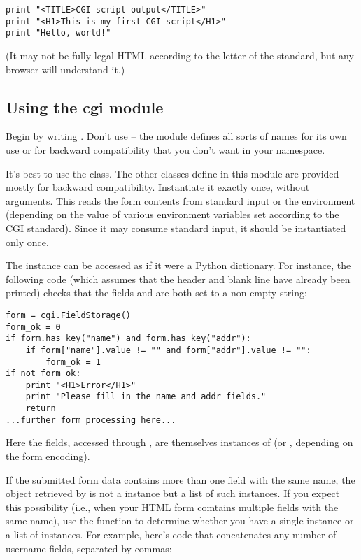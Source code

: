 \bcode\begin{verbatim}
print "<TITLE>CGI script output</TITLE>"
print "<H1>This is my first CGI script</H1>"
print "Hello, world!"
\end{verbatim}\ecode
%
(It may not be fully legal HTML according to the letter of the
standard, but any browser will understand it.)

\subsection{Using the cgi module}

Begin by writing .  Don't use  -- the
module defines all sorts of names for its own use or for backward 
compatibility that you don't want in your namespace.

It's best to use the  class.  The other classes define in this 
module are provided mostly for backward compatibility.  Instantiate it 
exactly once, without arguments.  This reads the form contents from 
standard input or the environment (depending on the value of various 
environment variables set according to the CGI standard).  Since it may 
consume standard input, it should be instantiated only once.

The  instance can be accessed as if it were a Python 
dictionary.  For instance, the following code (which assumes that the 
 header and blank line have already been printed) checks that 
the fields  and  are both set to a non-empty string:

\bcode\begin{verbatim}
form = cgi.FieldStorage()
form_ok = 0
if form.has_key("name") and form.has_key("addr"):
    if form["name"].value != "" and form["addr"].value != "":
        form_ok = 1
if not form_ok:
    print "<H1>Error</H1>"
    print "Please fill in the name and addr fields."
    return
...further form processing here...
\end{verbatim}\ecode
%
Here the fields, accessed through , are themselves instances
of  (or , depending on the form encoding).

If the submitted form data contains more than one field with the same
name, the object retrieved by  is not a 
instance but a list of such instances.  If you expect this possibility
(i.e., when your HTML form comtains multiple fields with the same
name), use the  function to determine whether you have a single
instance or a list of instances.  For example, here's code that
concatenates any number of username fields, separated by commas:


